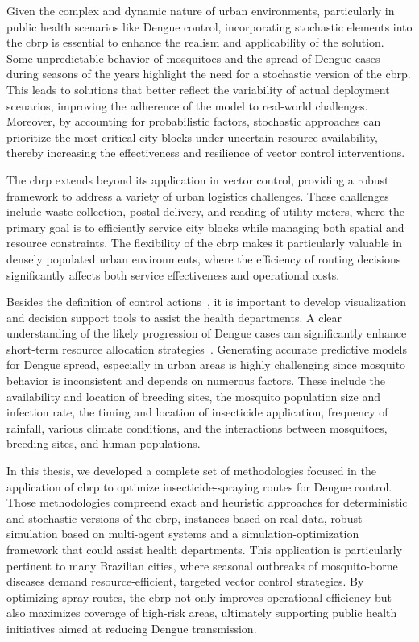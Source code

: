 Given the complex and dynamic nature of urban environments, particularly in
public health scenarios like Dengue control, incorporating stochastic elements
into the \gls{cbrp} is essential to enhance the realism and applicability of the
solution. Some unpredictable behavior of mosquitoes and the spread of Dengue
cases during seasons of the years highlight the need for a stochastic version of
the \gls{cbrp}. This leads to solutions that better reflect the variability of
actual deployment scenarios, improving the adherence of the model to real-world
challenges. Moreover, by accounting for probabilistic factors, stochastic
approaches can prioritize the most critical city blocks under uncertain resource
availability, thereby increasing the effectiveness and resilience of vector
control interventions.

The \gls{cbrp} extends beyond its application in vector control, providing a
robust framework to address a variety of urban logistics challenges. These
challenges include waste collection, postal delivery, and reading of utility
meters, where the primary goal is to efficiently service city blocks while
managing both spatial and resource constraints. The flexibility of the
\gls{cbrp} makes it particularly valuable in densely populated urban
environments, where the efficiency of routing decisions significantly affects
both service effectiveness and operational costs.

Besides the definition of control actions~\citep{gomez-2009,jing2019dengue}, it
is important to develop visualization and decision support tools to assist the
health departments. A clear understanding of the likely progression of Dengue
cases can significantly enhance short-term resource allocation
strategies~\citep{brasil-dept-helth:2009}. Generating accurate predictive models
for Dengue spread, especially in urban areas is highly challenging since
mosquito behavior is inconsistent and depends on numerous factors. These include
the availability and location of breeding sites, the mosquito population size
and infection rate, the timing and location of insecticide application,
frequency of rainfall, various climate conditions, and the interactions between
mosquitoes, breeding sites, and human populations.

In this thesis, we developed a complete set of methodologies focused in the
application of \gls{cbrp} to optimize insecticide-spraying routes for Dengue
control. Those methodologies compreend exact and heuristic approaches for
deterministic and stochastic versions of the \gls{cbrp}, instances based on real
data, robust simulation based on multi-agent systems and a
simulation-optimization framework that could assist health departments. This
application is particularly pertinent to many Brazilian cities, where seasonal
outbreaks of mosquito-borne diseases demand resource-efficient, targeted vector
control strategies. By optimizing spray routes, the \gls{cbrp} not only improves
operational efficiency but also maximizes coverage of high-risk areas,
ultimately supporting public health initiatives aimed at reducing Dengue
transmission.

